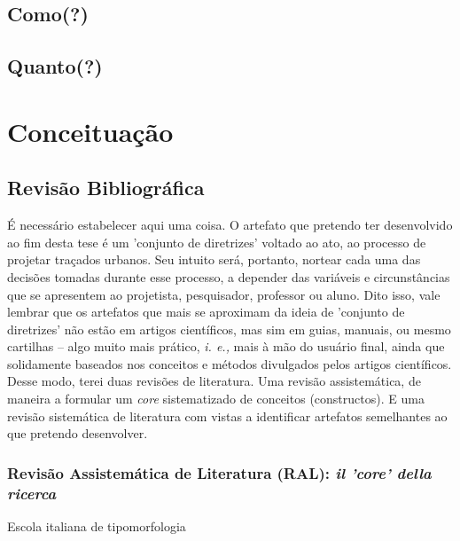 \documentclass[]{report}
\begin{document}
\section{Como(?)}

\section{Quanto(?)}


\setcounter{secnumdepth}{1}
\chapter{Conceituação}

	\section{Revisão Bibliográfica}

	É necessário estabelecer aqui uma coisa. O artefato que pretendo ter desenvolvido ao fim desta tese é um 'conjunto de diretrizes' voltado ao ato, ao processo de projetar traçados urbanos. Seu intuito será, portanto, nortear cada uma das decisões tomadas durante esse processo, a depender das variáveis e circunstâncias que se apresentem ao projetista, pesquisador, professor ou aluno. Dito isso, vale lembrar que os artefatos que mais se aproximam da ideia de 'conjunto de diretrizes' não estão em artigos científicos, mas sim em guias, manuais, ou mesmo cartilhas – algo muito mais prático, \textit{i. e.,} mais à mão do usuário final, ainda que solidamente baseados nos conceitos e métodos divulgados pelos artigos científicos. Desse modo, terei duas revisões de literatura. Uma revisão assistemática, de maneira a formular um \textit{core} sistematizado de conceitos (constructos). E uma revisão sistemática de literatura com vistas a identificar artefatos semelhantes ao que pretendo desenvolver.

		\subsection{Revisão Assistemática de Literatura (RAL): \textit{il 'core' della ricerca}}

		Escola italiana de tipomorfologia
\end{document}
